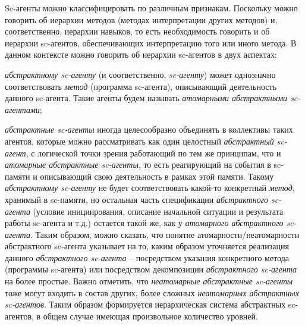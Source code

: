 Sc-агенты можно классифицировать по различным признакам. Поскольку можно говорить об иерархии методов (методах интерпретации других методов) и, соответственно, иерархии навыков, то есть необходимость говорить и об иерархии sc-агентов, обеспечивающих интерпретацию того или иного метода. В данном контексте можно говорить об иерархии sc-агентов в двух аспектах:
\begin{textitemize}
	\item \textit{абстрактному sc-агенту} (и соответственно, \textit{sc-агенту}) может однозначно соответствовать \textit{метод} (программа sc-агента), описывающий деятельность данного sc-агента. Такие агенты будем называть \textit{атомарными абстрактными sc-агентами};
	\item \textit{абстрактные sc-агенты} иногда целесообразно объединять в коллективы таких агентов, которые можно рассматривать как один целостный \textit{абстрактный sc-агент}, с логической точки зрения работающий по тем же принципам, что и \textit{атомарные абстрактные sc-агенты}, то есть реагирующий на события в sc-памяти и описывающий свою деятельность в рамках этой памяти. Такому \textit{абстрактному sc-агенту} не будет соответствовать какой-то конкретный \textit{метод}, хранимый в sc-памяти, но остальная часть спецификации \textit{абстрактного sc-агента} (условие инициирования, описание начальной ситуации и результата работы sc-агента и т.д.) остается такой же, как у \textit{атомарного абстрактного sc-агента}. Таким образом, можно сказать, что понятие атомарности/неатомарности абстрактного sc-агента указывает на то, каким образом уточняется реализация данного \textit{абстрактного sc-агента} -- посредством указания конкретного метода (программы sc-агента) или посредством декомпозиции \textit{абстрактного sc-агента} на более простые. Важно отметить, что \textit{неатомарные абстрактные sc-агенты} тоже могут входить в состав других, более сложных \textit{неатомарных абстрактных sc-агентов}. Таким образом формируется иерархическая система абстрактных sc-агентов, в общем случае имеющая произвольное количество уровней. 

\end{textitemize}
